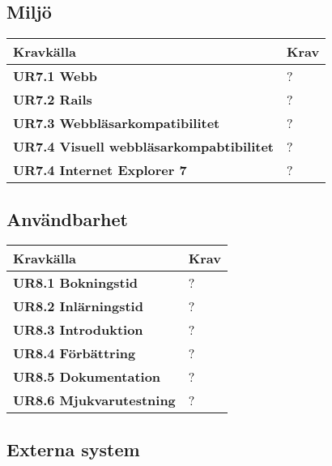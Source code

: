 \documentclass[a4paper, twoside, 11pt, titlepage]{article}
\begin{document}
	\subsection{Miljö}


	\begin {table} [ht] \begin{tabular} {  p{5.5cm} p{9.6cm} }
		\hline
		\sffamily\textbf{Kravkälla} & \sffamily\textbf{Krav } \\
		\hline
		\sffamily\textbf{UR7.1 Webb} & ?  \\
		\hline
		\sffamily\textbf{UR7.2 Rails} & ?  \\
		\hline
		\sffamily\textbf{UR7.3 Webbläsarkompatibilitet} & ?  \\
		\hline
		\sffamily\textbf{UR7.4 Visuell webbläsarkompabtibilitet} & ?  \\
		\hline
		\sffamily\textbf{UR7.4 Internet Explorer 7} & ?  \\
		\hline
	\end{tabular} \end{table} \FloatBarrier


	\subsection{Användbarhet}


	\begin {table} [ht] \begin{tabular} {  p{5.5cm} p{9.6cm} }
		\hline
		\sffamily\textbf{Kravkälla} & \sffamily\textbf{Krav } \\
		\hline
		\sffamily\textbf{UR8.1 Bokningstid} & ?  \\
		\hline
		\sffamily\textbf{UR8.2 Inlärningstid} & ?  \\
		\hline
		\sffamily\textbf{UR8.3 Introduktion} & ?  \\
		\hline
		\sffamily\textbf{UR8.4 Förbättring} & ?  \\
		\hline
		\sffamily\textbf{UR8.5 Dokumentation} & ?  \\
		\hline
		\sffamily\textbf{UR8.6 Mjukvarutestning} & ?  \\
		\hline
	\end{tabular} \end{table} \FloatBarrier


	\subsection{Externa system}
\end{document}
